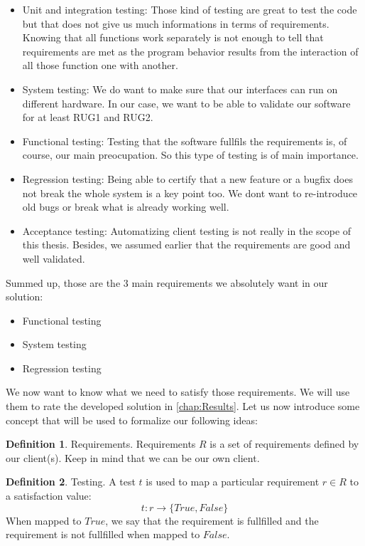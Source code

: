 \documentclass[12pt]{article}
\theoremstyle{definition}
\newtheorem{definition}{Definition}[section]
\theoremstyle{definition}
\theoremstyle{remark}
\begin{document}
\begin{itemize}
\item Unit and integration testing: Those kind of testing are great to test the code but that does not give us much informations in terms of requirements. Knowing that all functions work separately is not enough to tell that requirements are met as the program behavior results from the interaction of all those function one with another.
\item System testing: We do want to make sure that our interfaces can run on different hardware. In our case, we want to be able to validate our software for at least RUG1 and RUG2.
\item Functional testing: Testing that the software fullfils the requirements is, of course, our main preocupation. So this type of testing is of main importance.
\item Regression testing: Being able to certify that a new feature or a bugfix does not break the whole system is a key point too. We dont want to re-introduce old bugs or break what is already working well.
\item Acceptance testing: Automatizing client testing is not really in the scope of this thesis. Besides, we assumed earlier that the requirements are good and well validated.
\end{itemize}

Summed up, those are the 3 main requirements we absolutely want in our solution:

\begin{itemize}
\item Functional testing
\item System testing
\item Regression testing
\end{itemize}

We now want to know what we need to satisfy those requirements. We will use them to rate the developed solution in \autoref{chap:Results}. Let us now introduce some concept that will be used to formalize our following ideas:

\theoremstyle{definition}
\begin{definition}{Requirements.} Requirements $R$ is a set of requirements defined by our client(s). Keep in mind that we can be our own client.
\end{definition}

\theoremstyle{definition}\label{def:Testing}
\begin{definition}{Testing.} A test $t$ is used to map a particular requirement $r \in R$ to a satisfaction value:
$$
t: r \to \{True, False\}
$$
When mapped to $True$, we say that the requirement is fullfilled and the requirement is not fullfilled when mapped to $False$.
\end{definition}
\end{document}
